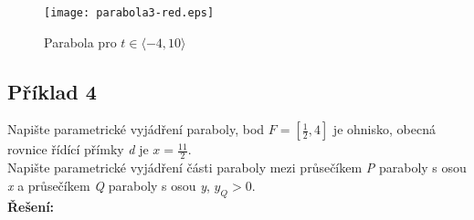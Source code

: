 		\vfill
		\begin{figure}[H]
			\centering
			\texttt{[image: parabola3-red.eps]}
			\caption{Parabola pro $t \in \langle-4, 10\rangle$}
								
		\end{figure}
		\clearpage
		\subsection*{Příklad 4}
		Napište parametrické vyjádření paraboly, bod $F=\left[\frac{1}{2}, 4\right]$ je ohnisko, obecná rovnice
		řídící přímky \textit{d} je $x=\frac{11}{2}$. \\
		Napište parametrické vyjádření části paraboly mezi průsečíkem \textit{P} paraboly s osou \textit{x} a průsečíkem
		\textit{Q} paraboly s osou \textit{y}, $y_Q>0$. \\[5pt]
		\textbf{Řešení:}
